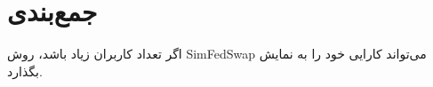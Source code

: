 %
%
%
%
%






\section{جمع‌بندی}
اگر تعداد کاربران زیاد باشد، روش SimFedSwap می‌تواند کارایی خود را به نمایش بگذارد.









